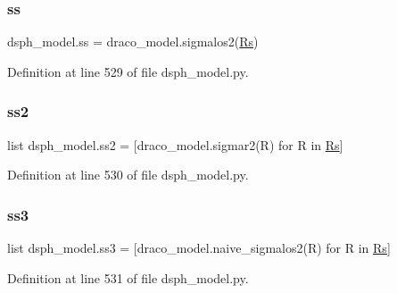 \subsubsection{\texorpdfstring{ss}{ss}}
{\footnotesize\ttfamily dsph\+\_\+model.\+ss = draco\+\_\+model.\+sigmalos2(\hyperlink{namespacedsph__model_af25a421d0de32d247b1aa0e8cf4894e3}{Rs})}



Definition at line 529 of file dsph\+\_\+model.\+py.

\mbox{\label{namespacedsph__model_abcaee14ea865b10f10051c500197bd4d}} 
\subsubsection{\texorpdfstring{ss2}{ss2}}
{\footnotesize\ttfamily list dsph\+\_\+model.\+ss2 = \mbox{[}draco\+\_\+model.\+sigmar2(R) for R in \hyperlink{namespacedsph__model_af25a421d0de32d247b1aa0e8cf4894e3}{Rs}\mbox{]}}



Definition at line 530 of file dsph\+\_\+model.\+py.

\mbox{\label{namespacedsph__model_a570b90342742f8795c9affea98066d87}} 
\subsubsection{\texorpdfstring{ss3}{ss3}}
{\footnotesize\ttfamily list dsph\+\_\+model.\+ss3 = \mbox{[}draco\+\_\+model.\+naive\+\_\+sigmalos2(R) for R in \hyperlink{namespacedsph__model_af25a421d0de32d247b1aa0e8cf4894e3}{Rs}\mbox{]}}



Definition at line 531 of file dsph\+\_\+model.\+py.

